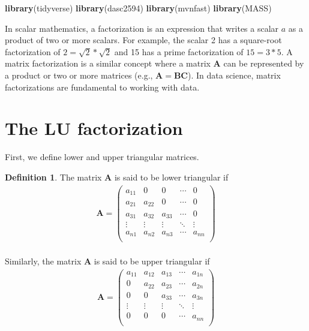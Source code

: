 \documentclass[
]{book}
\newenvironment{Shaded}{\begin{snugshade}}{\end{snugshade}}
\newcommand{\KeywordTok}[1]{\textcolor[rgb]{0.13,0.29,0.53}{\textbf{#1}}}
\newcommand{\NormalTok}[1]{#1}
\theoremstyle{definition}
\newtheorem{definition}{Definition}[chapter]
\theoremstyle{definition}
\theoremstyle{definition}
\theoremstyle{definition}
\theoremstyle{remark}
\begin{document}
\begin{Shaded}
\begin{Highlighting}[]
\KeywordTok{library}\NormalTok{(tidyverse)}
\KeywordTok{library}\NormalTok{(dasc2594)}
\KeywordTok{library}\NormalTok{(mvnfast)}
\KeywordTok{library}\NormalTok{(MASS)}
\end{Highlighting}
\end{Shaded}

In scalar mathematics, a factorization is an expression that writes a scalar \(a\) as a product of two or more scalars. For example, the scalar 2 has a square-root factorization of \(2 =\sqrt{2} * \sqrt{2}\) and 15 has a prime factorization of \(15 = 3 * 5\). A matrix factorization is a similar concept where a matrix \(\mathbf{A}\) can be represented by a product or two or more matrices (e.g., \(\mathbf{A} = \mathbf{B} \mathbf{C}\)). In data science, matrix factorizations are fundamental to working with data.

\hypertarget{the-lu-factorization}{%
\section{The LU factorization}\label{the-lu-factorization}}

First, we define lower and upper triangular matrices.

\begin{definition}
The matrix \(\mathbf{A}\) is said to be lower triangular if
\[
\begin{aligned}
\mathbf{A} = \begin{pmatrix} 
a_{11} & 0 & 0 & \cdots & 0 \\
a_{21} & a_{22} & 0 & \cdots & 0 \\
a_{31} & a_{32} & a_{33} & \cdots & 0 \\
\vdots & \vdots & \vdots & \ddots & \vdots \\
a_{n1} & a_{n2} & a_{n3} & \cdots & a_{nn} \\
\end{pmatrix}
\end{aligned}
\]\\
Similarly, the matrix \(\mathbf{A}\) is said to be upper triangular if
\[
\begin{aligned}
\mathbf{A} = \begin{pmatrix} 
a_{11} & a_{12} & a_{13} & \cdots & a_{1n} \\
0 & a_{22} & a_{23} & \cdots & a_{2n} \\
0 & 0 & a_{33} & \cdots & a_{3n} \\
\vdots & \vdots & \vdots & \ddots & \vdots \\
0 & 0 & 0 & \cdots & a_{nn} \\
\end{pmatrix}
\end{aligned}
\]
\end{definition}
\end{document}
